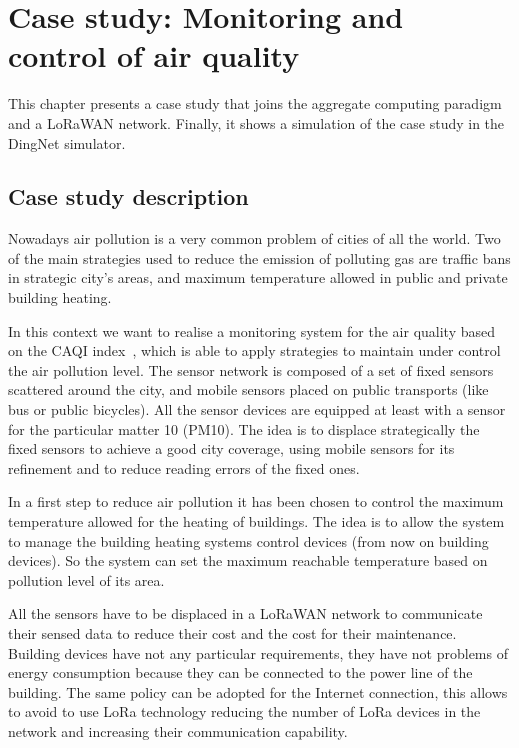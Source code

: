 \chapter{Case study: Monitoring and control of air quality}

\label{chap:case-staudyAC}
This chapter presents a case study that joins the aggregate computing paradigm and a LoRaWAN network. Finally, it shows a simulation of the case study in the DingNet simulator.

\section{Case study description}
Nowadays air pollution is a very common problem of cities of all the world.
Two of the main strategies used to reduce the emission of polluting gas are traffic bans in strategic city's areas, and maximum temperature allowed in public and private building heating.

In this context we want to realise a monitoring system for the air quality based on the CAQI index~\cite{CAQI}, which is able to apply strategies to maintain under control the air pollution level.
The sensor network is composed of a set of fixed sensors scattered around the city, and mobile sensors placed on public transports (like bus or public bicycles).
All the sensor devices are equipped at least with a sensor for the particular matter 10 (PM10).
The idea is to displace strategically the fixed sensors to achieve a good city coverage, using mobile sensors for its refinement and to reduce reading errors of the fixed ones.

In a first step to reduce air pollution it has been chosen to control the maximum temperature allowed for the heating of buildings.
The idea is to allow the system to manage the building heating systems control devices (from now on building devices). So the system can set the maximum reachable temperature based on pollution level of its area.

All the sensors have to be displaced in a LoRaWAN network to communicate their sensed data to reduce their cost and the cost for their maintenance. 
Building devices have not any particular requirements, they have not problems of energy consumption because they can be connected to the power line of the building.
The same policy can be adopted for the Internet connection, this allows to avoid to use LoRa technology reducing the number of LoRa devices in the network and increasing their communication capability.

